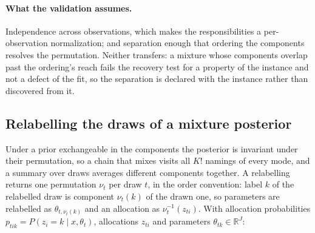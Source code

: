 \documentclass[11pt,a4paper]{article}
\begin{document}
\paragraph{What the validation assumes.}
Independence across observations, which makes the responsibilities a
per-observation normalization; and separation enough that ordering the
components resolves the permutation. Neither transfers: a mixture whose
components overlap past the ordering's reach fails the recovery test for a
property of the instance and not a defect of the fit, so the separation is
declared with the instance rather than discovered from it.

\subsection{Relabelling the draws of a mixture posterior}\label{sec:relabel}
Under a prior exchangeable in the components the posterior is invariant under
their permutation, so a chain that mixes visits all $K!$ namings of every mode,
and a summary over draws averages different components together. A
relabelling returns one permutation $\nu_t$ per draw $t$, in the order
convention: label $k$ of the relabelled draw is component $\nu_t(k)$ of the
drawn one, so parameters are relabelled as $\theta_{t,\nu_t(k)}$ and an
allocation as $\nu_t^{-1}(z_{ti})$. With allocation probabilities
$p_{tik} = P(z_i = k \mid x, \theta_t)$, allocations $z_{ti}$ and parameters
$\theta_{tk} \in \mathbb{R}^J$:
\end{document}
